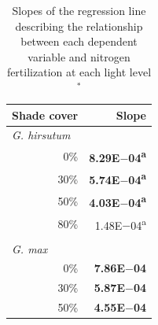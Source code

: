 \newpage
\begin{landscape}
    \begin{table}
        \caption[Slopes of the regression line describing the relationship between each dependent variable and nitrogen fertilization at each light level]{Slopes of the regression line describing the relationship between each dependent variable and nitrogen fertilization at each light level$^*$}
        \label{table:tab.a3}
        \centering
            \begin{tabular}{p{0.5cm}p{2cm}p{3cm}}
            \hline
            \multicolumn{2}{r}{Shade cover} 
            & \multicolumn{1}{r}{Slope}
            \\
            \hline
             
            \multicolumn{2}{l}{\textit{G. hirsutum}} & \\
            & \multicolumn{1}{r}{0\%}
            &  \multicolumn{1}{r}{\textbf{8.29E$-$04\textsuperscript{a}}}
            \\
            & \multicolumn{1}{r}{30\%}                     
            &  \multicolumn{1}{r}{\textbf{5.74E$-$04\textsuperscript{a}}}
            \\
            & \multicolumn{1}{r}{50\%}
            &  \multicolumn{1}{r}{\textbf{4.03E$-$04\textsuperscript{a}}}
            \\
            & \multicolumn{1}{r}{80\%}
            &  \multicolumn{1}{r}{1.48E$-$04\textsuperscript{a}}
            \\
            && 
            \\

            \multicolumn{2}{l}{\textit{G. max}} &
            \\
            & \multicolumn{1}{r}{0\%}
            &  \multicolumn{1}{r}{\textbf{7.86E$-$04}}
            \\
              
            & \multicolumn{1}{r}{30\%}
            &  \multicolumn{1}{r}{\textbf{5.87E$-$04}}
            \\
              
            & \multicolumn{1}{r}{50\%}
            &  \multicolumn{1}{r}{\textbf{4.55E$-$04}}
            \\
              

\end{tabular}
\end{table}
\end{landscape}
